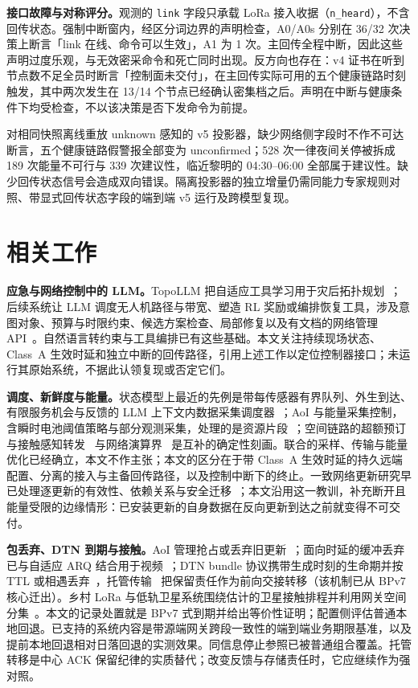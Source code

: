 \documentclass[11pt]{article}
\begin{document}
\textbf{接口故障与对称评分。}观测的 \texttt{link} 字段只承载 LoRa 接入收据（\texttt{n\_heard}），不含回传状态。强制中断窗内，经区分词边界的声明检查，A0/A0s 分别在 36/32 次决策上断言「link 在线、命令可以生效」，A1 为 1 次。主回传全程中断，因此这些声明过度乐观，与无效密采命令和死亡同时出现。反方向也存在：v4 证书在听到节点数不足全员时断言「控制面未交付」，在主回传实际可用的五个健康链路时刻触发，其中两次发生在 13/14 个节点已经确认密集档之后。声明在中断与健康条件下均受检查，不以该决策是否下发命令为前提。

对相同快照离线重放 unknown 感知的 v5 投影器，缺少网络侧字段时不作不可达断言，五个健康链路假警报全部变为 unconfirmed；528 次一律夜间关停被拆成 189 次能量不可行与 339 次建议性，临近黎明的 04:30--06:00 全部属于建议性。缺少回传状态信号会造成双向错误。隔离投影器的独立增量仍需同能力专家规则对照、带显式回传状态字段的端到端 v5 运行及跨模型复现。

\section{相关工作}
\label{sec:related}

\textbf{应急与网络控制中的 LLM。}TopoLLM 把自适应工具学习用于灾后拓扑规划~\cite{topollm}；后续系统让 LLM 调度无人机路径与带宽、塑造 RL 奖励或编排恢复工具，涉及意图对象、预算与时限约束、候选方案检查、局部修复以及有文档的网络管理 API~\cite{icgrestore,ossgpt}。自然语言转约束与工具编排已有这些基础。本文关注持续现场状态、Class~A 生效时延和独立中断的回传路径，引用上述工作以定位控制器接口；未运行其原始系统，不据此认领复现或否定它们。

\textbf{调度、新鲜度与能量。}状态模型上最近的先例是带每传感器有界队列、外生到达、有限服务机会与反馈的 LLM 上下文内数据采集调度器~\cite{icldc}；AoI 与能量采集控制，含瞬时电池阈值策略与部分观测采集，处理的是资源片段~\cite{bacinoglu1905,zakeri2311,costa2014pm}；空间链路的超额预订与接触感知转发~\cite{ccsdssabr} 与网络演算界~\cite{leboudec01} 是互补的确定性刻画。联合的采样、传输与能量优化已经确立，本文不作主张；本文的区分在于带 Class~A 生效时延的持久远端配置、分离的接入与主备回传路径，以及控制中断下的终止。一致网络更新研究早已处理逐更新的有效性、依赖关系与安全迁移~\cite{sdnconsistency}；本文沿用这一教训，补充断开且能量受限的边缘情形：已安装更新的自身数据在反向更新到达之前就变得不可交付。

\textbf{包丢弃、DTN 到期与接触。}AoI 管理抢占或丢弃旧更新~\cite{kam2016deadline,krishnan2019multihop}；面向时延的缓冲丢弃已与自适应 ARQ 结合用于视频~\cite{razavivideo}；DTN bundle 协议携带生成时刻的生命期并按 TTL 或相遇丢弃~\cite{dtnarch,iranmaneshdtnqueue,rfc9171}，托管传输~\cite{rfc5050} 把保留责任作为前向交接转移（该机制已从 BPv7 核心迁出）。乡村 LoRa 与低轨卫星系统围绕估计的卫星接触排程并利用网关空间分集~\cite{sateriot}。本文的记录处置就是 BPv7 式到期并给出等价性证明；配置侧评估普通本地回退。已支持的系统内容是带源端网关跨段一致性的端到端业务期限基准，以及提前本地回退相对日落回退的实测效果。同信息停止参照已被普通组合覆盖。托管转移是中心 ACK 保留纪律的实质替代；改变反馈与存储责任时，它应继续作为强对照。
\end{document}
